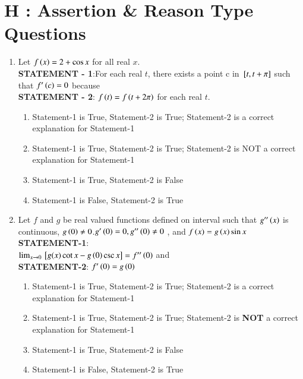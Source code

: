 \documentclass[journal,,12pt,onecolumn]{IEEEtran}
\theoremstyle{remark}
\begin{document}
\section*{H : Assertion \& Reason Type Questions}
\begin{enumerate}
    \item Let $f\left(x\right)=2 + \cos{x}$ for all real $x$.\\
    \textbf{STATEMENT - 1}:For each real $t$, there exists a point c in ${}\left[t,t+\pi\right]$ such that $f'\left(c\right)=0$ because \\
    \textbf{STATEMENT - 2}: $f\left(t\right)=f\left(t+2\pi\right)$ for each real $t$.
    \hfill{}
    \begin{enumerate}
    
        
    
        \item Statement-1 is True, Statement-2 is True; Statement-2 is a correct explanation for Statement-1
        \item Statement-1 is True, Statement-2 is True; Statement-2 is NOT a correct explanation for Statement-1
        \item Statement-1 is True, Statement-2 is False 
        \item Statement-1 is False, Statement-2 is True
        
    \end{enumerate}
\item Let $f$ and $g$ be real valued functions defined on interval  such that $g''\left(x\right)$ is continuous, $g\left(0\right)\neq0$.$g'\left(0\right)=0, g''\left(0\right)\neq0$ , and $f\left(x\right)=g\left(x\right)\sin{x}$\\
\textbf{STATEMENT-1}:\\
$\lim _{x \to 0}{}\left[g(x)\cot{x}-g\left(0\right)\csc{x}\right]=f''\left(0\right)$ and\\
\textbf{STATEMENT-2}: $f'\left(0\right)=g\left(0\right)$
\hfill{}
\begin{enumerate}

    

        \item Statement-1 is True, Statement-2 is True; Statement-2 is a correct explanation for Statement-1
        \item Statement-1 is True, Statement-2 is True; Statement-2 is \textbf{NOT} a correct explanation for Statement-1
        \item Statement-1 is True, Statement-2 is False 
        \item Statement-1 is False, Statement-2 is True
        
    \end{enumerate}
\end{enumerate}
\end{document}
